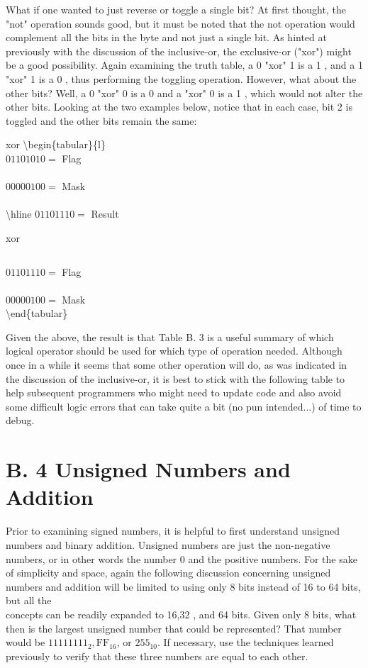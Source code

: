 \documentclass[10pt]{book}
\begin{document}
\begin{center}
\begin{center}
\begin{center}
\begin{center}
\begin{center}
What if one wanted to just reverse or toggle a single bit? At first thought, the "not" operation sounds good, but it must be noted that the not operation would complement all the bits in the byte and not just a single bit. As hinted at previously with the discussion of the inclusive-or, the exclusive-or ("xor") might be a good possibility. Again examining the truth table, a 0 "xor" 1 is a 1 , and a 1 "xor" 1 is a 0 , thus performing the toggling operation. However, what about the other bits? Well, a 0 "xor" 0 is a 0 and a "xor" 0 is a 1 , which would not alter the other bits. Looking at the two examples below, notice that in each case, bit 2 is toggled and the other bits remain the same:

xor \textbackslash begin\{tabular\}\{l\}\\
$01101010=$ Flag \\
\\
$00000100=$ Mask \\
\\
\textbackslash hline $01101110=$ Result

 xor $\quad$\begin{tabular}{l}
\end{tabular}

$01101110=$ Flag \\
\\
$00000100=$ Mask\\
\textbackslash end\{tabular\}

Given the above, the result is that Table B. 3 is a useful summary of which logical operator should be used for which type of operation needed. Although once in a while it seems that some other operation will do, as was indicated in the discussion of the inclusive-or, it is best to stick with the following table to help subsequent programmers who might need to update code and also avoid some difficult logic errors that can take quite a bit (no pun intended...) of time to debug.

\section*{B. 4 Unsigned Numbers and Addition}
Prior to examining signed numbers, it is helpful to first understand unsigned numbers and binary addition. Unsigned numbers are just the non-negative numbers, or in other words the number 0 and the positive numbers. For the sake of simplicity and space, again the following discussion concerning unsigned numbers and addition will be limited to using only 8 bits instead of 16 to 64 bits, but all the\\
concepts can be readily expanded to 16,32 , and 64 bits. Given only 8 bits, what then is the largest unsigned number that could be represented? That number would be $11111111_{2}, \mathrm{FF}_{16}$, or $255_{10}$. If necessary, use the techniques learned previously to verify that these three numbers are equal to each other.


\end{center}
\end{center}
\end{center}
\end{center}
\end{center}
\end{document}

